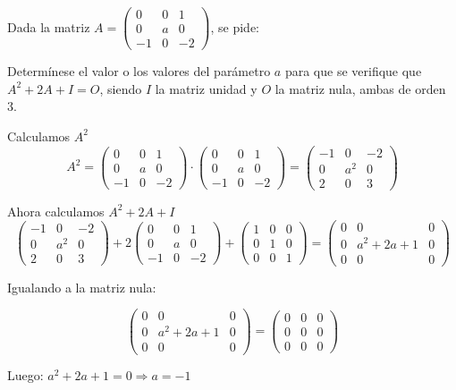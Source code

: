 \begin{ejemplo}
Dada la matriz $A=\begin{pmatrix}
 0 & 0 & 1 \\
 0 & a & 0 \\
 -1 & 0 & -2 
\end{pmatrix}
 $, se pide:

Determínese el valor o los valores del parámetro $a$ para que se verifique que $A^2+2A+I=O$, siendo $I$ la matriz unidad y $O$ la matriz nula, ambas de orden 3.

\tcblower

Calculamos $A^2$
\[ A^2=\begin{pmatrix}
 0 & 0 & 1 \\
 0 & a & 0 \\
 -1 & 0 & -2 
\end{pmatrix}\cdot
\begin{pmatrix}
 0 & 0 & 1 \\
 0 & a & 0 \\
 -1 & 0 & -2 
\end{pmatrix}= 
\begin{pmatrix}
 -1 & 0 & -2 \\
 0 & a^2 & 0 \\
 2 & 0 & 3 
\end{pmatrix}\]

Ahora calculamos $A^2+2A+I$
\[ \begin{pmatrix}
 -1 & 0 & -2 \\
 0 & a^2 & 0 \\
 2 & 0 & 3 
\end{pmatrix} +
2\begin{pmatrix}
 0 & 0 & 1 \\
 0 & a & 0 \\
 -1 & 0 & -2 
\end{pmatrix}+
\begin{pmatrix}
1 & 0 & 0 \\
0 & 1 & 0 \\
0 & 0 & 1
\end{pmatrix}=
\begin{pmatrix}
 0 & 0 & 0 \\
 0 & a^2+2a+1 & 0 \\
 0 & 0 & 0 
\end{pmatrix} \]

Igualando a la matriz nula:

\[
\begin{pmatrix}
0 & 0 & 0 \\
 0 & a^2+2a+1 & 0 \\
 0 & 0 & 0 
\end{pmatrix}=
\begin{pmatrix}
0 & 0 & 0 \\
0 & 0 & 0 \\
0 & 0 & 0
\end{pmatrix}
\]

Luego: $a^2+2a+1=0 \Rightarrow a=-1$

\end{ejemplo}

